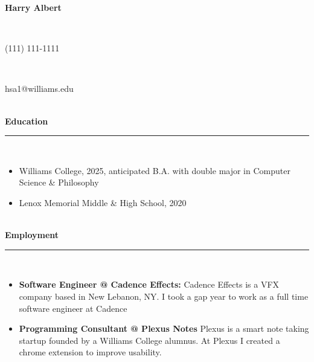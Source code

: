 \documentclass[10pt]{extarticle}
\begin{document}
\thispagestyle{empty}
\vspace{-\baselineskip}
\begin{center}
\Large \textbf{Harry Albert}
\end{center}
\vspace{-6.5ex}~\\ 
\vspace{-\baselineskip}
\begin{center}
\normalsize (111) 111-1111
\end{center}
\vspace{-6ex}~\\ 
\vspace{-\baselineskip}
\begin{center}
\normalsize hsa1@williams.edu
\end{center}
\vspace{-6ex}~\\ 
\textbf{Education}\\[-2ex]
\rule{\textwidth}{0.4pt}\\ 
\vspace{-\baselineskip}
\begin{itemize}[noitemsep,nolistsep]
\item Williams College, 2025, anticipated B.A. with double major in Computer Science \& Philosophy
\item Lenox Memorial Middle \& High School, 2020
\end{itemize}~\\[-1ex]
\textbf{Employment}\\[-2ex]
\rule{\textwidth}{0.4pt}\\ 
\vspace{-\baselineskip}
\begin{itemize}[noitemsep,nolistsep]
\item \textbf{Software Engineer @ Cadence Effects: } Cadence Effects is a VFX company based in New Lebanon, NY. I took a gap year to work as a full time software engineer at Cadence
\item \textbf{Programming Consultant @ Plexus Notes} Plexus is a smart note taking startup founded by a Williams College alumnus. At Plexus I created a chrome extension to improve usability.
\end{itemize}
\end{document}
